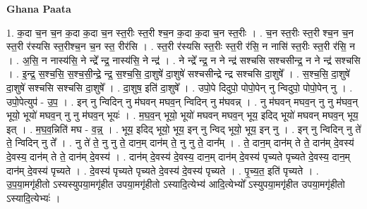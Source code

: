 \documentclass[17pt]{extarticle}
\begin{document}
\textbf{Ghana Paata } \newline

1. क॒दा च॒न च॒न क॒दा क॒दा च॒न स्त॒रीः स्त॒री श्च॒न क॒दा क॒दा च॒न स्त॒रीः । . च॒न स्त॒रीः स्त॒री श्च॒न च॒न स्त॒री र॑स्यसि स्त॒रीश्च॒न च॒न स्त॒ रीर॑सि । . स्त॒री र॑स्यसि स्त॒रीः स्त॒री र॑सि॒ न नासि॑ स्त॒रीः स्त॒री र॑सि॒ न । . अ॒सि॒ न नास्य॑सि॒ ने न्द्रे᳚ न्द्र॒ नास्य॑सि॒ ने न्द्र॑ । . ने न्द्रे᳚ न्द्र॒ न ने न्द्र॑ सश्चसि सश्चसीन्द्र॒ न ने न्द्र॑ सश्चसि । . इ॒न्द्र॒ स॒श्च॒सि॒ स॒श्च॒सी॒न्द्रे॒ न्द्र॒ स॒श्च॒सि॒ दा॒शुषे॑ दा॒शुषे॑ सश्चसीन्द्रे न्द्र सश्चसि दा॒शुषे᳚ । . स॒श्च॒सि॒ दा॒शुषे॑ दा॒शुषे॑ सश्चसि सश्चसि दा॒शुषे᳚ । . दा॒शुष॒ इति॑ दा॒शुषे᳚ । . उपो॒पे दिदुपो॒ पोपो॒पेन् नु न्विदुपो॒ पोपो॒पेन् नु । . उपो॒पेत्युप॑ - उ॒प॒ । . इन् नु न्विदिन् नु म॑घवन् मघव॒न् न्विदिन् नु म॑घवन्न् । . नु म॑घवन् मघव॒न् नु नु म॑घव॒न् भूयो॒ भूयो॑ मघव॒न् नु नु म॑घव॒न् भूयः॑ । . म॒घ॒व॒न् भूयो॒ भूयो॑ मघवन् मघव॒न् भूय॒ इदिद् भूयो॑ मघवन् मघव॒न् भूय॒ इत् । . म॒घ॒व॒न्निति॑ मघ - व॒न्न्॒ । . भूय॒ इदिद् भूयो॒ भूय॒ इन् नु न्विद् भूयो॒ भूय॒ इन् नु । . इन् नु न्विदिन् नु ते॑ ते॒ न्विदिन् नु ते᳚ । . नु ते॑ ते॒ नु नु ते॒ दान॒म् दान॑म् ते॒ नु नु ते॒ दान᳚म् । . ते॒ दान॒म् दान॑म् ते ते॒ दान॑म् दे॒वस्य॑ दे॒वस्य॒ दान॑म् ते ते॒ दान॑म् दे॒वस्य॑ । . दान॑म् दे॒वस्य॑ दे॒वस्य॒ दान॒म् दान॑म् दे॒वस्य॑ पृच्यते पृच्यते दे॒वस्य॒ दान॒म् दान॑म् दे॒वस्य॑ पृच्यते । . दे॒वस्य॑ पृच्यते पृच्यते दे॒वस्य॑ दे॒वस्य॑ पृच्यते । . पृ॒च्य॒त॒ इति॑ पृच्यते । . उ॒प॒या॒मगृ॑हीतो ऽस्यस्युपया॒मगृ॑हीत उपया॒मगृ॑हीतो ऽस्यादि॒त्येभ्य॑ आदि॒त्येभ्यो᳚ ऽस्युपया॒मगृ॑हीत उपया॒मगृ॑हीतो ऽस्यादि॒त्येभ्यः॑ । \newline
\end{document}
